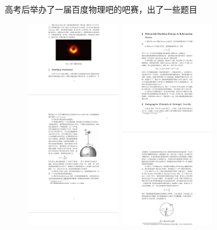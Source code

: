 \documentclass[hyperref,UTF8]{ctexart}
\begin{document}
高考后举办了一届百度物理吧的吧赛，出了一些题目
\begin{figure}[H]
    \centering
    \includegraphics[width=4cm]{Screenshot_20210907_144556_cn.wps.moffice_eng.jpg}
    \includegraphics[width=4cm]{Screenshot_20210907_144604_cn.wps.moffice_eng.jpg}
\end{figure}
\end{document}
